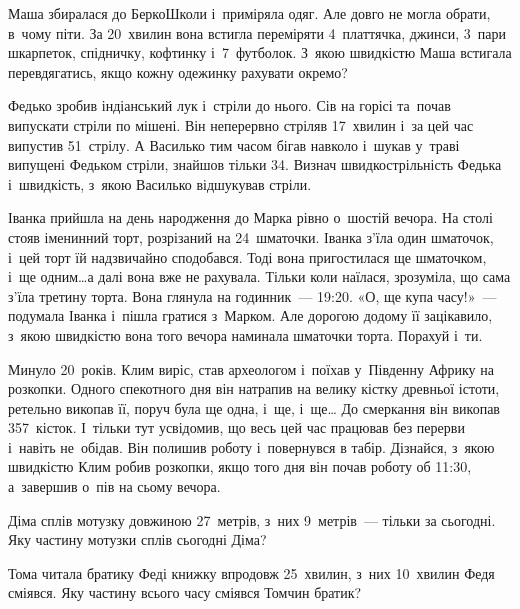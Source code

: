 \problem
Маша збиралася до БеркоШколи і~приміряла одяг.
Але довго не могла обрати, в~чому піти.
За 20~хвилин вона встигла переміряти 4~платтячка, джинси, 3~пари шкарпеток,
спідничку, кофтинку і~7~футболок.
З~якою швидкістю Маша встигала перевдягатись,
якщо кожну одежинку рахувати окремо?


\problem
Федько зробив індіанський лук і~стріли до нього.
Сів на горісі та~почав випускати стріли по мішені.
Він неперервно стріляв 17~хвилин і~за цей час випустив 51~стрілу.
А Василько тим часом бігав навколо і~шукав у~траві випущені Федьком стріли,
знайшов тільки 34.
Визнач швидкострільність Федька і~швидкість, з~якою Василько
відшукував стріли.


\problem
Іванка прийшла на день народження до Марка рівно о~шостій вечора.
На столі стояв іменинний торт, розрізаний на 24~шматочки.
Іванка з’їла один шматочок, і~цей торт їй надзвичайно сподобався.
Тоді вона пригостилася ще шматочком, і~ще одним\ldots  а далі вона вже не рахувала.
Тільки коли наїлася, зрозуміла, що сама з’їла третину торта.
Вона глянула на годинник~--- 19:20.
«О, ще купа часу!»~--- подумала Іванка і~пішла гратися з~Марком.
Але дорогою додому її зацікавило, з~якою швидкістю вона того
вечора наминала шматочки торта. Порахуй і~ти.


\problem
Минуло 20~років. Клим виріс, став археологом і~поїхав у~Південну Африку
на розкопки. Одного спекотного дня він натрапив на велику кістку
древньої істоти, ретельно викопав її, поруч була ще одна, і~ще, і~ще\ldots
До смеркання він викопав 357~кісток. І~тільки тут усвідомив, що весь
цей час працював без перерви і~навіть не~обідав. Він полишив роботу
і~повернувся в табір. Дізнайся, з~якою швидкістю Клим робив розкопки,
якщо того дня він почав роботу об 11:30, а~завершив о~пів на сьому вечора.


\problem
Діма сплів мотузку довжиною 27~метрів, з~них 9~метрів~--- тільки за сьогодні.
Яку частину мотузки сплів сьогодні Діма?


\problem
Тома читала братику Феді книжку впродовж 25~хвилин,
з~них 10~хвилин Федя сміявся.
Яку частину всього часу сміявся Томчин братик?
